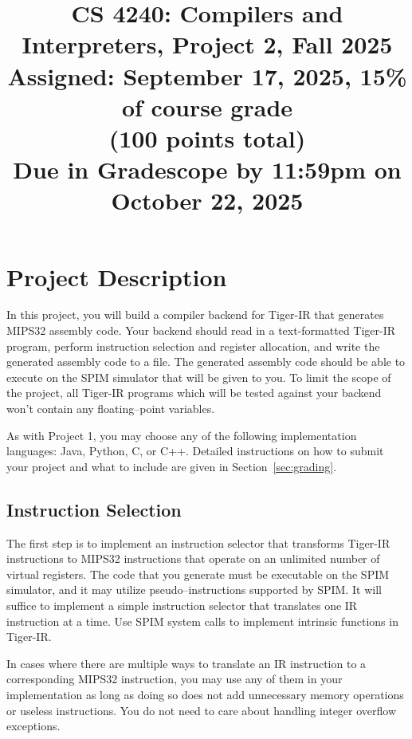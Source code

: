 \documentclass[12pt]{article}
\title{CS 4240: Compilers and Interpreters, Project 2, Fall 2025\\
\Large
Assigned: September 17, 2025, 15\% of course grade\\
(100 points total)\\
Due in Gradescope by 11:59pm on October 22, 2025}\\
\author{}
\date{}
\begin{document}
\maketitle
\thispagestyle{fancy}

\section{Project Description}

In this project, you will build a compiler backend for Tiger-IR that generates MIPS32 assembly code. Your backend should read in a text-formatted Tiger-IR program, perform instruction selection and register allocation, and write the generated assembly code to a file. The generated assembly code should be able to execute on the SPIM simulator that will be given to you. To limit the scope of the project, all Tiger-IR programs which will be tested against your backend won't contain any floating--point variables.

As with Project 1, you may choose any of the following implementation languages: Java, Python, C, or C++. Detailed instructions on how to submit your project and what to include are given in Section~\ref{sec:grading}.

\subsection{Instruction Selection}\label{sec:instruction-selection}

The first step is to implement an instruction selector that transforms Tiger-IR instructions to MIPS32 instructions that operate on an unlimited number of virtual registers. The code that you generate must be executable on the SPIM simulator, and it may utilize pseudo--instructions supported by SPIM. It will suffice to implement a simple instruction selector that translates one IR instruction at a time. Use SPIM system calls to implement intrinsic functions in Tiger-IR.

In cases where there are multiple ways to translate an IR instruction to a corresponding MIPS32 instruction, you may use any of them in your implementation as long as doing so does not add unnecessary memory operations or useless instructions. You do not need to care about handling integer overflow exceptions.
\end{document}
